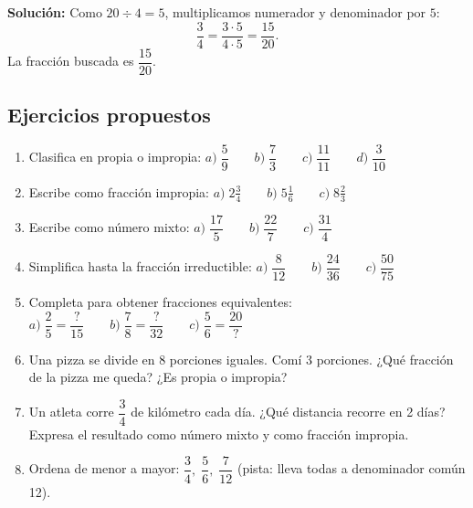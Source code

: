 \documentclass[12pt, letterpaper]{article}
\begin{document}
\begin{cuadrosolucion}
  \textbf{Solución:} Como $20 \div 4 = 5$, multiplicamos numerador y denominador por $5$:
  $$\frac{3}{4} = \frac{3 \cdot 5}{4 \cdot 5} = \frac{15}{20}.$$
  La fracción buscada es $\dfrac{15}{20}$.
\end{cuadrosolucion}


\subsection{Ejercicios propuestos}

\begin{enumerate}[leftmargin=*]
  \item \facil{} Clasifica en propia o impropia: $a) \; \dfrac{5}{9} \qquad b) \; \dfrac{7}{3} \qquad c) \; \dfrac{11}{11} \qquad d) \; \dfrac{3}{10}$

  \item \facil{} Escribe como fracción impropia: $a) \; 2\frac{3}{4} \qquad b) \; 5\frac{1}{6} \qquad c) \; 8\frac{2}{3}$

  \item \facil{} Escribe como número mixto: $a) \; \dfrac{17}{5} \qquad b) \; \dfrac{22}{7} \qquad c) \; \dfrac{31}{4}$

  \item \facil{} Simplifica hasta la fracción irreductible: $a) \; \dfrac{8}{12} \qquad b) \; \dfrac{24}{36} \qquad c) \; \dfrac{50}{75}$

  \item \facil{} Completa para obtener fracciones equivalentes: $a) \; \dfrac{2}{5} = \dfrac{?}{15} \qquad b) \; \dfrac{7}{8} = \dfrac{?}{32} \qquad c) \; \dfrac{5}{6} = \dfrac{20}{?}$

  \item \medio{} Una pizza se divide en 8 porciones iguales. Comí 3 porciones. ¿Qué fracción de la pizza me queda? ¿Es propia o impropia?

  \item \medio{} Un atleta corre $\dfrac{3}{4}$ de kilómetro cada día. ¿Qué distancia recorre en 2 días? Expresa el resultado como número mixto y como fracción impropia.

  \item \dificil{} Ordena de menor a mayor: $\dfrac{3}{4}, \; \dfrac{5}{6}, \; \dfrac{7}{12}$ (pista: lleva todas a denominador común 12).
\end{enumerate}

\newpage
\end{document}

